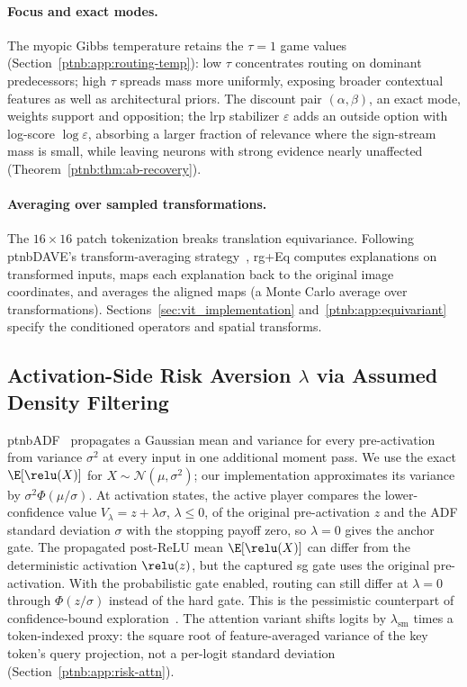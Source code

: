 \paragraph{Focus and exact modes.}
The myopic Gibbs temperature retains the $\tau=1$ game values (Section~\ref{ptnb:app:routing-temp}):
low $\tau$ concentrates routing on dominant predecessors; high $\tau$ spreads mass more uniformly, exposing broader contextual features as well as architectural priors. The discount pair $(\alpha,\beta)$, an exact mode, weights support and opposition; the \ac{lrp} stabilizer $\varepsilon$ adds an outside option with log-score $\log\varepsilon$, absorbing a larger fraction of relevance where the sign-stream mass is small,
while leaving neurons with strong evidence nearly unaffected (Theorem~\ref{ptnb:thm:ab-recovery}).

\paragraph{Averaging over sampled transformations.}\label{subsec:technicalities}
The $16\times16$ patch tokenization breaks translation equivariance. Following \ac{ptnbDAVE}'s transform-averaging strategy~\parencite{Wrobel2024}, \ac{rg}+Eq computes explanations on transformed inputs, maps each explanation back to the original image coordinates, and averages the aligned maps (a Monte Carlo average over transformations). Sections~\ref{sec:vit_implementation} and~\ref{ptnb:app:equivariant} specify the conditioned operators and spatial transforms.

\subsection{Activation-Side Risk Aversion \texorpdfstring{$\lambda$}{lambda} via Assumed Density Filtering}\label{ptnb:app:adf-variance}

\Ac{ptnbADF}~\parencite{gast2018lightweight} propagates a Gaussian mean and variance for every pre-activation from variance $\sigma^2$ at every input in one additional moment pass. We use the exact
$\E[\relu(X)]$ for $X\sim\mathcal N(\mu,\sigma^2)$; our implementation approximates its variance
by $\sigma^2\Phi(\mu/\sigma)$. At activation states, the active player compares the lower-confidence value
$V_\lambda=z+\lambda\sigma$, $\lambda\le0$, of the original pre-activation $z$ and the ADF
standard deviation $\sigma$ with the stopping payoff zero, so $\lambda=0$ gives the anchor gate. The propagated post-ReLU mean $\E[\relu(X)]$ can differ from the deterministic
activation $\relu(z)$, but the captured \ac{sg} gate uses the original pre-activation. With the
probabilistic gate enabled, routing can still differ at $\lambda=0$ through $\Phi(z/\sigma)$
instead of the hard gate.
This is the pessimistic counterpart of confidence-bound exploration~\parencite{auer2002finite,zhang2021risk}.
The attention variant shifts logits by $\lambda_{\mathrm{sm}}$ times a token-indexed proxy: the
square root of feature-averaged variance of the key token's query projection, not a per-logit
standard deviation (Section~\ref{ptnb:app:risk-attn}).

